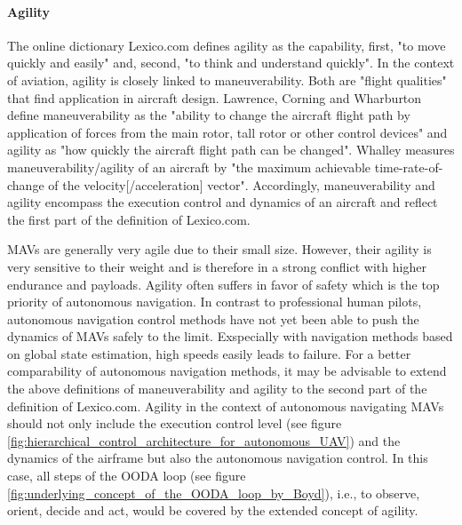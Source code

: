 \paragraph{Agility}
The online dictionary Lexico.com \cite{Lexico.com-agility} defines agility as the capability,
first, "to move quickly and easily" and, second, "to think and understand quickly".
In the context of aviation, agility is closely linked to maneuverability. 
Both are "flight qualities" \cite{Whalley1991} that find application in aircraft design.
Lawrence, Corning and Wharburton \cite{Lawrence1991} define
maneuverability as the "ability to change the aircraft flight path by application of forces from the main rotor, 
tall rotor or other control devices"
and agility as "how quickly the aircraft flight path can be changed".
Whalley \cite{Whalley1991} measures maneuverability/agility of an aircraft by
"the maximum achievable time-rate-of-change of the velocity[/acceleration] vector".
Accordingly, maneuverability and agility encompass the execution control and dynamics of an aircraft
and reflect the first part of the definition of Lexico.com.

MAVs are generally very agile due to their small size.
However, their agility is very sensitive to their weight and is therefore in a strong conflict with higher endurance and payloads. \cite{Verbeke2017}
Agility often suffers in favor of safety which is the top priority of autonomous navigation.
In contrast to professional human pilots,
autonomous navigation control methods have not yet been able to push the dynamics of MAVs safely to the limit. \cite{Kaufmann2018}
Exspecially with navigation methods based on global state estimation, high speeds easily leads to failure. \cite{loquercio2018learning}
For a better comparability of autonomous navigation methods, it may be advisable to extend the above definitions of maneuverability and agility 
to the second part of the definition of Lexico.com.
Agility in the context of autonomous navigating MAVs should not only include the execution control level (see figure \ref{fig:hierarchical_control_architecture_for_autonomous_UAV})
and the dynamics of the airframe but also the autonomous navigation control.
In this case, all steps of the OODA loop (see figure \ref{fig:underlying_concept_of_the_OODA_loop_by_Boyd}), 
i.e., to observe, orient, decide and act, would be covered by the extended concept of agility.









